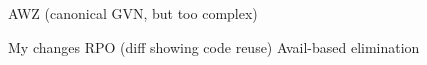 AWZ (canonical GVN, but too complex)

My changes
  RPO (diff showing code reuse)
  Avail-based elimination
